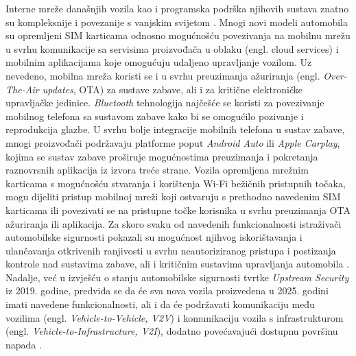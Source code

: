 \documentclass[times, utf8, diplomski, numeric]{fer}
\begin{document}
Interne mreže današnjih vozila kao i programska podrška njihovih sustava znatno su kompleksnije i povezanije s vanjskim svijetom \cite{huq2020driving}. Mnogi novi modeli automobila su opremljeni SIM karticama odnosno mogućnošću povezivanja na mobilnu mrežu u svrhu komunikacije sa servisima proizvođača u oblaku (engl. cloud services) i mobilnim aplikacijama koje omogućuju udaljeno upravljanje vozilom. Uz nevedeno, mobilna mreža koristi se i u svrhu preuzimanja ažuriranja (engl. \textit{Over-The-Air updates}, OTA) za sustave zabave, ali i za kritične elektroničke upravljačke jedinice. \textit{Bluetooth} tehnologija najčešće se koristi za povezivanje mobilnog telefona sa sustavom zabave kako bi se omogućilo pozivanje i reprodukcija glazbe. U svrhu bolje integracije mobilnih telefona u sustav zabave, mnogi proizvođači podržavaju platforme poput \textit{Android Auto} ili \textit{Apple Carplay}, kojima se sustav zabave proširuje mogućnostima preuzimanja i pokretanja raznovrsnih aplikacija iz izvora treće strane. Vozila opremljena mrežnim karticama s mogućnošću stvaranja i korištenja Wi-Fi bežičnih pristupnih točaka, mogu dijeliti pristup mobilnoj mreži koji ostvaruju s prethodno navedenim SIM karticama ili povezivati se na pristupne točke korisnika u svrhu preuzimanja OTA ažuriranja ili aplikacija. Za skoro svaku od navedenih funkcionalnosti istraživači automobilske sigurnosti pokazali su mogućnost njihvog iskorištavanja i ulančavanja otkrivenih ranjivosti u svrhu neautoriziranog pristupa i postizanja kontrole nad sustavima zabave, ali i kritičnim sustavima upravljanja automobila \cite{tencent2017free, tencent2018over, tencent2019bmw, tencent2018bmw, miller2015remote, curry2023web}. Nadalje, već u izvješću o stanju automobilske sigurnosti tvrtke \textit{Upstream Security} iz 2019. godine, predviđa se da će sva nova vozila proizvedena u 2025. godini imati navedene funkcionalnosti, ali i da će podržavati komunikaciju među vozilima (engl. \textit{Vehicle-to-Vehicle, V2V}) i komunikaciju vozila s infrastrukturom (engl. \textit{Vehicle-to-Infrastructure, V2I}), dodatno povećavajući dostupnu površinu napada \cite{upstream2019report}.
\end{document}
